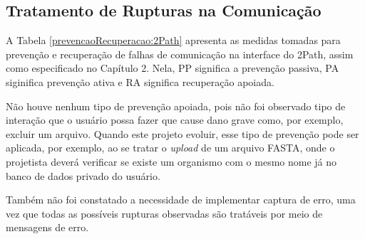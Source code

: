 \subsection{Tratamento de Rupturas na Comunicação}

\indent A Tabela \ref{prevencaoRecuperacao:2Path} apresenta as medidas tomadas para prevenção e recuperação de falhas de comunicação na interface do 2Path, assim como especificado no Capítulo 2. Nela, PP significa a prevenção passiva, PA siginifica prevenção ativa e RA significa recuperação apoiada. 

\indent Não houve nenhum tipo de prevenção apoiada, pois não foi observado tipo de interação que o usuário possa fazer que cause dano grave como, por exemplo, excluir um arquivo. Quando este projeto evoluir, esse tipo de prevenção pode ser aplicada, por exemplo, ao se tratar o \textit{upload} de um arquivo FASTA, onde o projetista deverá verificar se existe um organismo com o mesmo nome já no banco de dados privado do usuário. 

\indent Também não foi constatado a necessidade de implementar captura de erro, uma vez que todas as possíveis rupturas observadas são tratáveis por meio de mensagens de erro.

